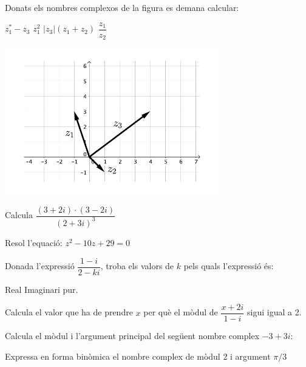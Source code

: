 \begin{autoaval}{40}

\begin{mylist}
	
	\vspace{-2cm}
		
	\exer[2]  \begin{minipage}[t]{0.6\textwidth}
		Donats els nombres complexos de la figura es demana calcular:
		\begin{tasks}
			\task $z_1^* - z_3$
			\task $z_1^2$
			\task $|z_3|(z_1+z_2)$
			\task $\dfrac{z_1}{z_2}$
		\end{tasks}	
	\end{minipage}
	\begin{minipage}{0.4\textwidth}
		\centering
		\vspace{2.5cm}
		\includegraphics[width=0.7\textwidth]{img-04/autoaval-complexos1}
	\end{minipage}
\answers[cols=2]{[$-5-6i$, $-8-6i$, $10i$, $-2+i$]}

	
\exer[2]  Calcula
$\dfrac{(3+2 i)\cdot(3-2i)}{(2+3i)^3}$

\exer[2] Resol l'equació: $z^2 - 10z+29=0$

\exer[2] Donada l'expressió $\dfrac{1-i}{2-k i}$, troba els valors de $k$ pels quals l'expressió és: 
\begin{tasks}
	\task Real
	\task Imaginari pur.
\end{tasks}
\answers{[Real $k=-2$, Imaginari pur $k=-2$]}

\exer[2] Calcula el valor que ha de prendre $x$ per què el mòdul de $\dfrac{x+2i}{1-i}$ sigui igual a 2.

\exer[2] Calcula el mòdul i l'argument principal del següent nombre
complex $-3 + 3i$:

\exer[2] Expressa en forma binòmica el nombre complex de
mòdul 2 i argument $\pi/3$
 

\end{mylist}
\end{autoaval}
